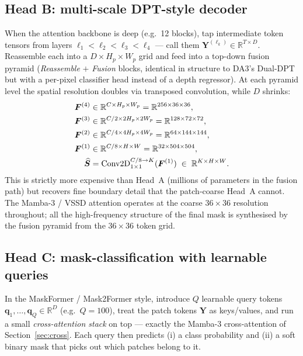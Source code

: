 \documentclass[11pt,a4paper]{article}
\begin{document}
\subsection{Head B: multi-scale DPT-style decoder}
\label{sec:seg-B}

When the attention backbone is deep (e.g.\ 12 blocks), tap
intermediate token tensors from layers
$\ell_1<\ell_2<\ell_3<\ell_4$ — call them
$\bm{Y}^{(\ell_k)}\in\mathbb{R}^{T\times D}$. Reassemble each into a
$D\!\times\!H_p\!\times\!W_p$ grid and feed into a top-down fusion
pyramid (\emph{Reassemble} $+$ \emph{Fusion} blocks, identical in
structure to DA3's Dual-DPT but with a per-pixel classifier head
instead of a depth regressor). At each pyramid level the spatial
resolution doubles via transposed convolution, while $D$ shrinks:
\begin{align}
  \bm{F}^{(4)} &\in\mathbb{R}^{C\times H_p\times W_p}
       = \mathbb{R}^{256\times 36\times 36}, \\
  \bm{F}^{(3)} &\in\mathbb{R}^{C/2\times 2H_p\times 2W_p}
       = \mathbb{R}^{128\times 72\times 72}, \notag \\
  \bm{F}^{(2)} &\in\mathbb{R}^{C/4\times 4H_p\times 4W_p}
       = \mathbb{R}^{64\times 144\times 144}, \\
  \bm{F}^{(1)} &\in\mathbb{R}^{C/8\times H\times W}
       = \mathbb{R}^{32\times 504\times 504}, \notag\\
  \widehat{\bm{S}} &= \mathrm{Conv2D}_{1\times 1}^{C/8\to K}(\bm{F}^{(1)})
       \;\in\;\mathbb{R}^{K\times H\times W}.
\end{align}
This is strictly more expensive than Head~A (millions of parameters
in the fusion path) but recovers fine boundary detail that the
patch-coarse Head~A cannot. The Mamba-3 / VSSD attention operates at
the coarse $36\!\times\!36$ resolution throughout; all the high-frequency
structure of the final mask is synthesised by the fusion pyramid from
the $36\!\times\!36$ token grid.

\subsection{Head C: mask-classification with learnable queries}
\label{sec:seg-C}

In the MaskFormer / Mask2Former style, introduce $Q$ learnable query
tokens $\bm{q}_1,\dots,\bm{q}_Q\in\mathbb{R}^{D}$ (e.g.\ $Q\!=\!100$),
treat the patch tokens $\bm{Y}$ as keys/values, and run a small
\emph{cross-attention stack} on top — exactly the Mamba-3
cross-attention of Section~\ref{sec:cross}. Each query then predicts
(i) a class probability and (ii) a soft binary mask that picks out
which patches belong to it.
\end{document}

